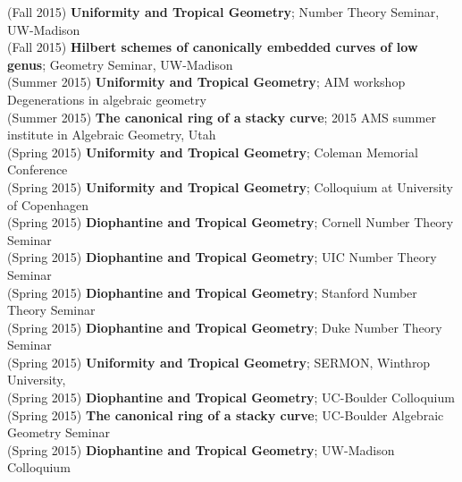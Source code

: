 \documentclass[margin,line]{res}
\begin{document}
\begin{resume}
(Fall 2015) \textbf{Uniformity and Tropical Geometry};
Number Theory Seminar, UW-Madison
\vspace{.05cm}\\
(Fall 2015) \textbf{Hilbert schemes of canonically embedded curves of low genus};
Geometry Seminar, UW-Madison
\vspace{.05cm}\\
(Summer 2015) \textbf{Uniformity and Tropical Geometry};
AIM workshop Degenerations in algebraic geometry
\vspace{.05cm}\\
(Summer 2015) \textbf{The canonical ring of a stacky curve};  
2015 AMS summer institute in Algebraic Geometry, Utah
\vspace{.05cm}\\
(Spring 2015) \textbf{Uniformity and Tropical Geometry};
Coleman Memorial Conference
\vspace{.05cm}\\
(Spring 2015) \textbf{Uniformity and Tropical Geometry};
Colloquium at University of Copenhagen
\vspace{.05cm}\\
(Spring 2015) \textbf{Diophantine and Tropical Geometry};
Cornell Number Theory Seminar
\vspace{.05cm}\\
(Spring 2015) \textbf{Diophantine and Tropical Geometry};
UIC Number Theory Seminar
\vspace{.05cm}\\
(Spring 2015) \textbf{Diophantine and Tropical Geometry};
Stanford Number Theory Seminar
\vspace{.05cm}\\
(Spring 2015) \textbf{Diophantine and Tropical Geometry};
Duke Number Theory Seminar
\vspace{.05cm}\\
(Spring 2015) \textbf{Uniformity and Tropical Geometry};
SERMON, Winthrop University, 
\vspace{.05cm}\\
(Spring 2015) \textbf{Diophantine and Tropical Geometry};
UC-Boulder Colloquium
\vspace{.05cm}\\
(Spring 2015) \textbf{The canonical ring of a stacky curve};  
UC-Boulder Algebraic Geometry Seminar
\vspace{.05cm}\\
(Spring 2015) \textbf{Diophantine and Tropical Geometry};
UW-Madison Colloquium
\vspace{.05cm}\\

\end{resume}
\end{document}
